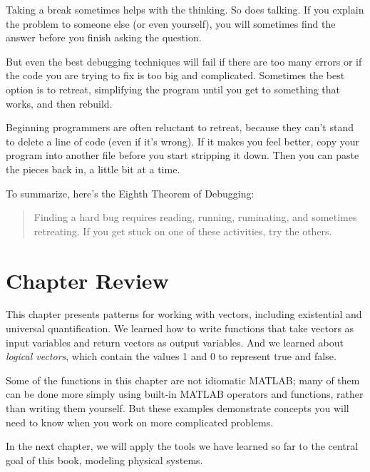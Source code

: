 Taking a break sometimes helps with the thinking.  So does talking.
If you explain the problem to someone else (or even yourself), you
will sometimes find the answer before you finish asking the question.

But even the best debugging techniques will fail if there are too many
errors or if the code you are trying to fix is too big and
complicated.  Sometimes the best option is to retreat, simplifying the
program until you get to something that works, and then rebuild.

Beginning programmers are often reluctant to retreat, because
they can't stand to delete a line of code (even if it's wrong).
If it makes you feel better, copy your program into another file
before you start stripping it down.  Then you can paste the pieces
back in, a little bit at a time.


To summarize, here's the Eighth Theorem of Debugging:

\begin{quote}
Finding a hard bug requires reading, running, ruminating,
and sometimes retreating.  If you get stuck on one of these
activities, try the others.
\end{quote}

\section{Chapter Review}

This chapter presents patterns for working with vectors, including existential and universal quantification.
We learned how to write functions that take vectors as input variables and return vectors as output variables.
And we learned about \emph{logical vectors}, which contain the values 1 and 0 to represent true and false.

Some of the functions in this chapter are not idiomatic MATLAB; many of them can be done more simply using built-in MATLAB operators and functions, rather than writing them yourself.  But these examples demonstrate concepts you will need to know when you work on more complicated problems.

In the next chapter, we will apply the tools we have learned so far to the central goal of this book, modeling physical systems.





